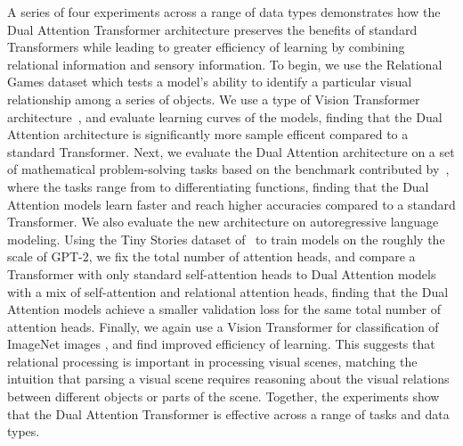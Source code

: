 A series of four experiments across a range of data types demonstrates how the Dual Attention Transformer architecture preserves the benefits of standard Transformers while leading to greater efficiency of learning by combining relational information and sensory information. To begin, we use the Relational Games dataset which tests
a model's ability to identify a particular visual relationship among a series of objects. We use a type of Vision Transformer architecture~\citep{dosovitskiyImageWorth16x162020}, 
and evaluate learning curves of the models, finding that the Dual Attention architecture 
is significantly more sample efficent compared to a standard Transformer. 
Next, we evaluate the Dual Attention architecture on a set of mathematical problem-solving tasks based on the benchmark contributed by~\citet{saxtonAnalyzingMathematicalReasoning2019}, where the tasks range from 
to differentiating functions, finding that the Dual Attention models learn faster and reach higher accuracies compared to a standard Transformer. 
We also evaluate the new architecture on autoregressive language modeling.
Using the Tiny Stories dataset of~\citet{eldanTinyStoriesHowSmall2023} to train models on the roughly the scale of GPT-2, 
we fix the total number of attention heads, and compare a Transformer with only standard self-attention heads to Dual Attention models with a mix of self-attention and relational attention heads, finding that the Dual Attention models achieve a smaller validation loss for the same total number of attention heads. Finally, 
we again use a Vision Transformer for classification of ImageNet images \citep{dosovitskiyImageWorth16x162020}, and find improved efficiency 
of learning. This suggests that relational processing is important in processing visual scenes, matching the intuition that parsing a visual scene requires reasoning about the visual relations between different objects or parts of the scene. Together, the experiments 
show that the Dual Attention Transformer is effective across a range of tasks and data types.




